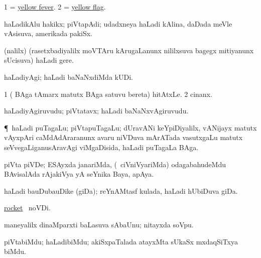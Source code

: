 \bentry
{}
\gl{\nA} 
\bmng
\bnum
\num{1} = \hyperlink{yellow fever}{yellow fever}.  
\num{2} = \hyperlink{yellow flag}{yellow flag}. 
\enum
\emng
\eentry

\bentry
{} 
\gl{\nA} 
\bmng
haLadikAlu hakikx; piVtapAdi; udadxneya haLadi kAlina, daDada meVle vAsisuva, amerikada pakiSx.
\emng
\eentry

\bentry
{}
\gl{\nA} 
\bmng
(\UK nalilx) (rasetxbadiyalilx moVTAru kArugaLanunx nililxsuva bagegx mitiyanunx sUcisuva) haLadi gere.
\emng 
\eentry

\bentry
{} 
\gl{\kirxvi} 
\bmng
haLadiyAgi; haLadi baNaNxdiMda kUDi.
\emng
\eentry

\bentry
{}
\gl{\nA} 
\bmng
\bnum
\num{1} ( BAga tAmarx matutx  BAga satuvu bereta) hitAtxLe. 
\num{2} cinanx.
\enum
\emng
\eentry

\bentry
{} 
\gl{\nA}  
\bmng
haLadiyAgiruvudu;  piVtatavx; haLadi baNaNxvAgiruvudu.
\emng
\eentry

\bentry
{}
\gl{\nA} 
\bmng
\P\ haLadi puTagaLu; piVtapuTagaLu; dUravANi keYpiDiyalilx, vANijayx matutx vAyxpAri caMdAdAraranunx  avaru niVDuva mArATada vasutxgaLu matutx seVvegaLiganusAravAgi viMgaDisida, haLadi puTagaLa BAga.
\emng
\eentry

\bentry
{}
\gl{\nA} 
\bmng
piVta piVDe; ESAyxda janariMda, (\kanmu\ ciVniVyariMda) odagabahudeMdu BAvisalAda rAjakiVya yA seYnika Baya, apAya.
\emng
\eentry

\bentry
{} 
\gl{\nA} 
\bmng
haLadi bauDubauDike (giDa); reYnAMtasf kulada, haLadi hUbiDuva giDa.
\emng
\eentry

\bentry
{} 
\gl{\nA} 
\bmng
\hyperref{kandict_r.pdf}{R}{rocket(1) pagu}{rocket} \pagu\ noVDi.
\emng
\eentry

\bentry
{}
\gl{\nA}  
\bmng
maneyalilx dinaMparxti baLasuva sAbaUnu; nitayxda soVpu.
\emng
\eentry

\bentry
{}
\gl{\nA}  
\bmng
piVtabiMdu; haLadibiMdu; akiSxpaTalada atayxMta sUkaSx mxdaqSiTxya biMdu. 
\emng
\eentry

